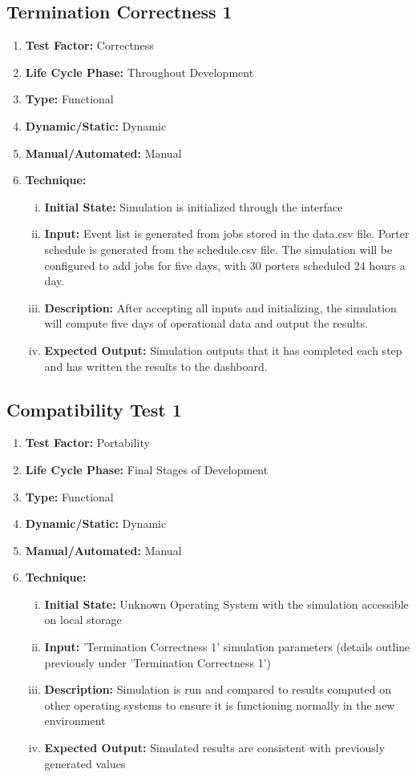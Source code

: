 \documentclass[paper=letter, fontsize=10pt]{scrartcl}
\numberwithin{equation}{section}		%
\numberwithin{figure}{section}			%
\numberwithin{table}{section}				%
\begin{document}
\subsection{Termination Correctness 1}
\begin{enumerate}[]
	\item \textbf{Test Factor:} Correctness
	\item \textbf{Life Cycle Phase:} Throughout Development
	\item \textbf{Type:} Functional
	\item \textbf{Dynamic/Static:} Dynamic
	\item \textbf{Manual/Automated:} Manual
	\item \textbf{Technique:}
		\begin{enumerate}[(i)]
			\item \textbf{Initial State:} Simulation is initialized through the interface  
			\item \textbf{Input:} Event list is generated from jobs stored in the data.csv file. Porter schedule is generated from the schedule.csv file. The simulation will be configured to add jobs for five days, with 30 porters scheduled 24 hours a day.
			\item \textbf{Description:} After accepting all inputs and initializing, the simulation will compute five days of operational data and output the results.
			\item \textbf{Expected Output:} Simulation outputs that it has completed each step and has written the results to the dashboard.
		\end{enumerate}
\end{enumerate}

\subsection{Compatibility Test 1}
\begin{enumerate}[] 
	\item \textbf{Test Factor:} Portability 
	\item \textbf{Life Cycle Phase:} Final Stages of Development
	\item \textbf{Type:} Functional
	\item \textbf{Dynamic/Static:} Dynamic
	\item \textbf{Manual/Automated:} Manual
	\item \textbf{Technique:}
		\begin{enumerate}[(i)]
			\item \textbf{Initial State:} Unknown Operating System with the simulation accessible on local storage  
			\item \textbf{Input:} 'Termination Correctness 1' simulation parameters (details outline previously under 'Termination Correctness 1')
			\item \textbf{Description:} Simulation is run and compared to results computed on other operating systems to ensure it is functioning normally in the new environment
			\item \textbf{Expected Output:} Simulated results are consistent with previously generated values
		\end{enumerate}
\end{enumerate}
\end{document}
